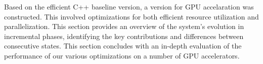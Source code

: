 
Based on the efficient C++ baseline version, a version for GPU accelaration
was constructed.
This involved optimizations for both efficient resource utilization and
parallelization.
This section provides an overview of the system's evolution in incremental
phases, identifying the key contributions and differences between consecutive
states. This section concludes with an in-depth evaluation of the performance
of our various optimizations on a number of GPU
accelerators.

% 


